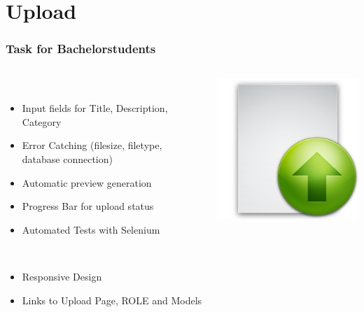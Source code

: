 \section{Upload}

\begin{frame}
  \frametitle{Task for Bachelorstudents}
  \begin{columns}
  	\begin{column}{0.8\textwidth}
  \begin{description}[]
    \item[Upload Page] \hfill \\
        \begin{itemize}
          \item Input fields for Title, Description, Category
          \item Error Catching (filesize, filetype, database connection)
	 \item Automatic preview generation
	 \item Progress Bar for upload status
	\item Automated Tests with Selenium
        \end{itemize}
    \item[Welcome Page] \hfill \\
      \begin{itemize}
        \item Responsive Design
        \item Links to Upload Page, ROLE and Models
      \end{itemize}
  \end{description} 
    \end{column}
    \begin{column}{0.2\textwidth}
   	  \includegraphics[width=\textwidth]{images/upload}
    \end{column}
  \end{columns}
\end{frame}


